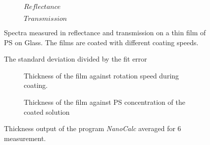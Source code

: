 \begin{figure}[ht]
    \centering
    \begin{subfigure}[b]{0.70\textwidth}
        \centering
        
        \caption{$Reflectance$}
        \label{fig:y equals x}
    \end{subfigure}  
    

    \begin{subfigure}[b]{0.70\textwidth}
        \centering
           
        \caption{$Transmission$} 
        \label{fig:three sin x}
    \end{subfigure}

    \caption{Spectra measured in reflectance and transmission on a thin film of PS on Glass. The films are coated with different coating speeds.}
    \label{fig:SpecRefTrans}
\end{figure}

\begin{figure}[h]
    \centering
    
    \caption{The standard deviation divided by the fit error}
    \label{fig:errorFrac}

\end{figure}


\begin{figure}[h]
    \centering
    \begin{subfigure}[b]{\textwidth}
        \centering
        
        \caption{Thickness of the film against rotation speed during coating.}
        \label{fig:VglMethConcThick}
    \end{subfigure}

    \vspace{1cm}
    \begin{subfigure}[b]{\textwidth}
        \centering
           
        \caption{Thickness of the film against PS concentration of the coated solution} 
        \label{fig:VglMethRotThick}
    \end{subfigure}

    \caption{Thickness output of the program \textit{NanoCalc} averaged for 6 measurement.}
    \label{fig:thickconcrpm}
\end{figure}

